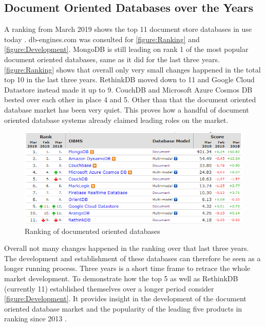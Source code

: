 \subsection{Document Oriented Databases over the Years}
A ranking from March 2019 shows the top 11 document store databases in use today \parencite{dbEngineRankingPopularity}. db-engines.com was consulted for \autoref{figure:Ranking} and \autoref{figure:Development}. MongoDB is still leading on rank 1 of the most popular document oriented databases, same as it did for the last three years. \autoref{figure:Ranking} shows that overall only very small changes happened in the total top 10 in the last three years. RethinkDB moved down to 11 and Google Cloud Datastore instead made it up to 9. CouchDB and Microsoft Azure Cosmos DB bested over each other in place 4 and 5. Other than that the document oriented database market has been very quiet. This proves how a handful of document oriented database systems already claimed leading roles on the market.
\begin{figure}
    \includegraphics[width=\textwidth]{img/dbRanked.png}
    \caption{Ranking of documented oriented databases}
    \label{figure:Ranking}
\end{figure}
Overall not many changes happened in the ranking over that last three years. The development and establishment of these databases can therefore be seen as a longer running process. Three years is a short time frame to retrace the whole market development. To demonstrate how the top 5 as well as RethinkDB (currently 11) established themselves over a longer period consider \autoref{figure:Development}. It provides insight in the development of the document oriented database market and the popularity of the leading five products in ranking since 2013 \parencite{dbEngineRankingPopularity}. 

